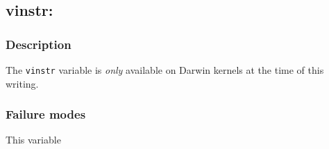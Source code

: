 \clearpage
{}
{}
\label{vars:vinstr}
\subsection*{vinstr: }

\subsubsection*{Description}

The \verb|vinstr| variable is \emph{only} available on Darwin kernels
at the time of this writing.

\subsubsection*{Failure modes}

This variable
